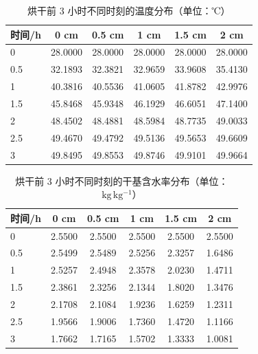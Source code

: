 \begin{table}[htbp]
\centering
\caption{烘干前 3 小时不同时刻的温度分布（单位：℃）}
\label{tab:t3}
\begin{tabular}{lccccc}
\toprule
时间/h & 0 cm & 0.5 cm & 1 cm & 1.5 cm & 2 cm \\
\midrule
0 & 28.0000 & 28.0000 & 28.0000 & 28.0000 & 28.0000 \\
0.5 & 32.1893 & 32.3821 & 32.9659 & 33.9608 & 35.4130 \\
1 & 40.3816 & 40.5536 & 41.0605 & 41.8782 & 42.9976 \\
1.5 & 45.8468 & 45.9348 & 46.1929 & 46.6051 & 47.1400 \\
2 & 48.4502 & 48.4881 & 48.5984 & 48.7735 & 49.0033 \\
2.5 & 49.4670 & 49.4792 & 49.5136 & 49.5653 & 49.6609 \\
3 & 49.8495 & 49.8553 & 49.8746 & 49.9101 & 49.9664 \\
\bottomrule
\end{tabular}
\end{table}

\begin{table}[htbp]
\centering
\caption{烘干前 3 小时不同时刻的干基含水率分布（单位：$\mathrm{kg\,kg^{-1}}$）}
\label{tab:t4}
\begin{tabular}{lccccc}
\toprule
时间/h & 0 cm & 0.5 cm & 1 cm & 1.5 cm & 2 cm \\
\midrule
0 & 2.5500 & 2.5500 & 2.5500 & 2.5500 & 2.5500 \\
0.5 & 2.5499 & 2.5489 & 2.5256 & 2.3257 & 1.6486 \\
1 & 2.5257 & 2.4948 & 2.3578 & 2.0230 & 1.4711 \\
1.5 & 2.3861 & 2.3256 & 2.1344 & 1.8020 & 1.3476 \\
2 & 2.1708 & 2.1084 & 1.9236 & 1.6259 & 1.2311 \\
2.5 & 1.9566 & 1.9006 & 1.7360 & 1.4720 & 1.1166 \\
3 & 1.7662 & 1.7165 & 1.5702 & 1.3333 & 1.0081 \\
\bottomrule
\end{tabular}
\end{table}

